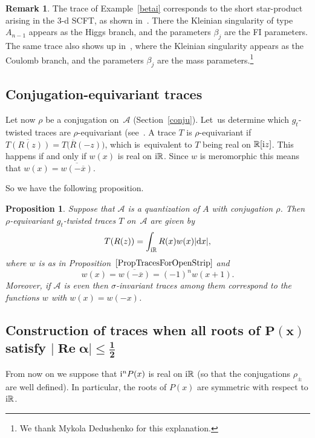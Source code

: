 \documentclass[pdftex]{sigma}
\newcommand{\RN}{\mathbb{R}} %
\newcommand{\ovl}{\overline}
\newcommand{\mc}[1]{\mathcal{#1}}
\renewcommand{\Re}{\operatorname{Re}}
\newtheorem{Proposition}[Theorem]{Proposition}
\theoremstyle{definition}
\newtheorem{Remark}[Theorem]{Remark}
\numberwithin{equation}{section}
\begin{document}
\begin{Remark} The trace of Example~\ref{betai} corresponds to the short star-product arising in the 3-d SCFT, as shown in~\cite[Section~8.1.2]{DPY}. There the Kleinian singularity of type $A_{n-1}$ appears as the Higgs branch, and the parameters $\beta_j$ are the FI parameters. The same trace also shows up in~\cite[equation~(5.27)]{DFPY}, where
the Kleinian singularity appears as the Coulomb branch, and the parameters $\beta_j$ are the mass parameters.\footnote{We thank Mykola Dedushenko for this explanation.}
\end{Remark}

\subsection{Conjugation-equivariant traces}
Let now $\rho$ be a conjugation on~$\mc A$ (Section~\ref{conju}). Let~us determine which $g_t$-twisted traces are $\rho$-equivariant (see~\cite[Section~3.6]{ES}. A trace $T$ is $\rho$-equivariant if $\ovl{T(R(z))}=T\big(\ovl{R}(-z)\big)$, which is~equivalent to $T$ being real on $\RN[{\rm i}z]$. This happens if and only if $w(x)$ is real on ${\rm i}\RN$. Since $w$ is meromorphic this means that $w(x)=\ovl{w(-\ovl{x})}$.

So we have the following proposition.

\begin{Proposition}
\label{PropQuaternionicTraces}
Suppose that $\mc{A}$ is a quantization of $A$ with conjugation $\rho$. Then $\rho$-equivariant $g_t$-twisted traces $T$ on~$\mc A$ are
given by
\[
T(R(z))=\int_{{\rm i}\RN} R(x)w(x)|{\rm d}x|,
\]
where $w$ is as in Proposition~$\ref{PropTracesForOpenStrip}$ and
\[w(x)=\ovl{w(-\ovl{x})}=(-1)^n w(x+1).
\]
Moreover, if $\mc A$ is even then $\sigma$-invariant traces among them
correspond to the functions $w$ with $w(x)=w(-x)$.
\end{Proposition}

\subsection[Construction of traces when all roots of P(x) satisfy |Re alpha| < 1/2]
{Construction of traces when all roots of $\boldsymbol{P(x)}$ satisfy $\boldsymbol{|\Re\alpha|\leq \frac{1}{2}}$}

From now on we suppose that ${\rm i}^nP(x)$ is real on ${\rm i}\RN$ (so that the conjugations $\rho_\pm$ are well defined). In particular, the roots of $P(x)$ are symmetric with respect to ${\rm i}\RN$.
\end{document}
